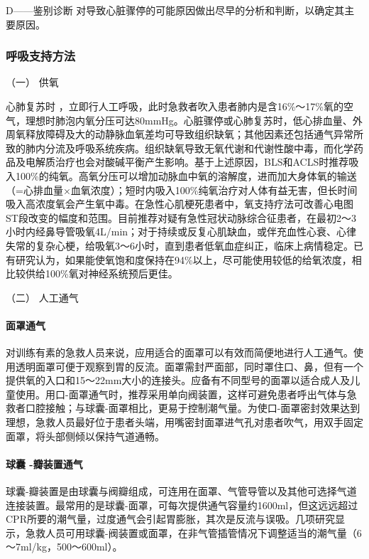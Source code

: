 D------鉴别诊断
对导致心脏骤停的可能原因做出尽早的分析和判断，以确定其主要原因。

\subsubsection{呼吸支持方法}

\hypertarget{text00284.htmlux5cux23CHP10-1-5-3-1}{}
（一） 供氧

心肺复苏时
，立即行人工呼吸，此时急救者吹入患者肺内是含16\%～17\%氧的空气，理想时肺泡内氧分压可达80mmHg。心脏骤停或心肺复苏时，低心排血量、外周氧释放障碍及大的动静脉血氧差均可导致组织缺氧；其他因素还包括通气异常所致的肺内分流及呼吸系统疾病。组织缺氧导致无氧代谢和代谢性酸中毒，而化学药品及电解质治疗也会对酸碱平衡产生影响。基于上述原因，BLS和ACLS时推荐吸入100\%的纯氧。高氧分压可以增加动脉血中氧的溶解度，进而加大身体氧的输送（=心排血量×血氧浓度）；短时内吸入100\%纯氧治疗对人体有益无害，但长时间吸入高浓度氧会产生氧中毒。在急性心肌梗死患者中，氧支持疗法可改善心电图ST段改变的幅度和范围。目前推荐对疑有急性冠状动脉综合征患者，在最初2～3小时内经鼻导管吸氧4L/min；对于持续或反复心肌缺血，或伴充血性心衰、心律失常的复杂心梗，给吸氧3～6小时，直到患者低氧血症纠正，临床上病情稳定。已有研究认为，如果能使氧饱和度保持在94\%以上，尽可能使用较低的给氧浓度，相比较供给100\%氧对神经系统预后更佳。

\hypertarget{text00284.htmlux5cux23CHP10-1-5-3-2}{}
（二） 人工通气

\paragraph{面罩通气}

对训练有素的急救人员来说，应用适合的面罩可以有效而简便地进行人工通气。使用透明面罩可便于观察到胃的反流。面罩需封严面部，同时罩住口、鼻，但有一个提供氧的入口和15～22mm大小的连接头。应备有不同型号的面罩以适合成人及儿童使用。用口-面罩通气时，推荐采用单向阀装置，这样可避免患者呼出气体与急救者口腔接触；与球囊-面罩相比，更易于控制潮气量。为使口-面罩密封效果达到理想，急救人员最好位于患者头端，用嘴密封面罩进气孔对患者吹气，用双手固定面罩，将头部侧倾以保持气道通畅。

\paragraph{球囊 -瓣装置通气}

球囊-瓣装置是由球囊与阀瓣组成，可连用在面罩、气管导管以及其他可选择气道连接装置。最常用的是球囊-面罩，可每次提供通气容量约1600ml，但这远远超过CPR所要的潮气量，过度通气会引起胃膨胀，其次是反流与误吸。几项研究显示，急救人员可用球囊-阀装置或面罩，在非气管插管情况下调整适当的潮气量（6～7ml/kg，500～600ml）。

